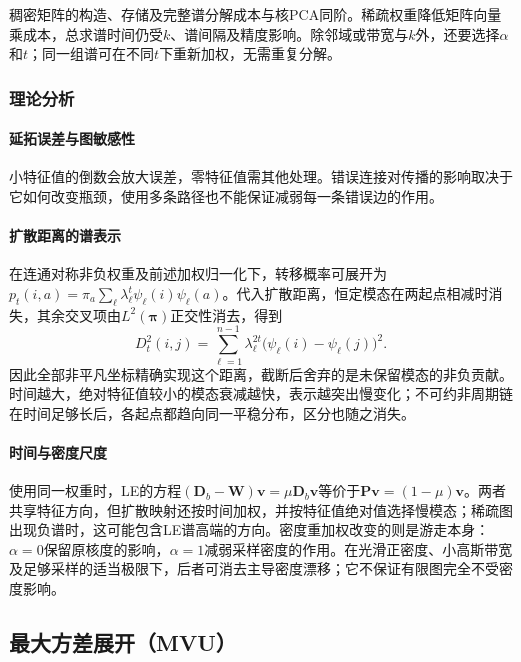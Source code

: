 稠密矩阵的构造、存储及完整谱分解成本与核PCA同阶。稀疏权重降低矩阵向量乘成本，总求谱时间仍受$k$、谱间隔及精度影响。除邻域或带宽与$k$外，还要选择$\alpha$和$t$；同一组谱可在不同$t$下重新加权，无需重复分解。

\subsubsection{理论分析}

\paragraph{延拓误差与图敏感性}

小特征值的倒数会放大误差，零特征值需其他处理。错误连接对传播的影响取决于它如何改变瓶颈，使用多条路径也不能保证减弱每一条错误边的作用。

\paragraph{扩散距离的谱表示}

在连通对称非负权重及前述加权归一化下，转移概率可展开为$p_t(i,a)=\pi_a\sum_\ell\lambda_\ell^t\psi_\ell(i)\psi_\ell(a)$。代入扩散距离，恒定模态在两起点相减时消失，其余交叉项由$L^2(\bm\pi)$正交性消去，得到
\begin{equation}
 \label{eq:dim-diffusion-identity}
 D_t^2(i,j)=\sum_{\ell=1}^{n-1}\lambda_\ell^{2t}
       \bigl(\psi_\ell(i)-\psi_\ell(j)\bigr)^2.
\end{equation}
因此全部非平凡坐标精确实现这个距离，截断后舍弃的是未保留模态的非负贡献。时间越大，绝对特征值较小的模态衰减越快，表示越突出慢变化；不可约非周期链在时间足够长后，各起点都趋向同一平稳分布，区分也随之消失。

\paragraph{时间与密度尺度}

使用同一权重时，LE的方程$(\bm D_b-\bm W)\bm v=\mu\bm D_b\bm v$等价于$\bm P\bm v=(1-\mu)\bm v$。两者共享特征方向，但扩散映射还按时间加权，并按特征值绝对值选择慢模态；稀疏图出现负谱时，这可能包含LE谱高端的方向。密度重加权改变的则是游走本身：$\alpha=0$保留原核度的影响，$\alpha=1$减弱采样密度的作用。在光滑正密度、小高斯带宽及足够采样的适当极限下，后者可消去主导密度漂移；它不保证有限图完全不受密度影响。

\subsection{最大方差展开（MVU）}

